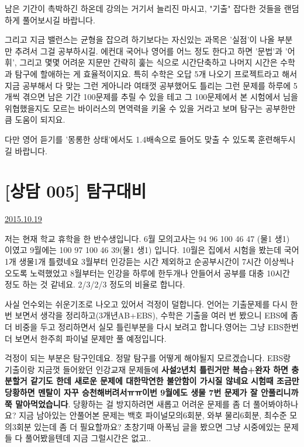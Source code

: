     남은 기간이 촉박하긴 하온데 강의는 거기서 늘리진 마시고, "기출" 잡다한 것들을 랜덤하게 풀어보시길 바랍니다.
    \vspace{5mm}

    그리고 지금 밸런스는 균형을 잡으려 하기보다는
    자신있는 과목은 '실점'이 나올 부분만 추려서 그걸 공부하시길.
    에컨대 국어나 영어를 어느 정도 한다고 하면 '문법'과 '어휘', 그리고 몇몇 어려운 지문만 간략히 훑는 식으로 시간단축하고
    나머지 시간은 수학과 탐구에 할애하는 게 효율적이지요.
    특히 수학은 오답 5개 나오기 프로젝트라고 해서 지금 공부해서 다 맞는 그런 게아니라
    여태껏 공부했어도 틀리는 그런 문제를 하루에 5개씩 겪으면 남은 기간 100문제를 추릴 수 있을 테고
    그 100문제에서 본 시험에서 님을 위협했을지도 모르는 바이러스의 면역력을 키울 수 있을 거라고 보며
    탐구는 공부한만큼 도움이 되지요.
    \vspace{5mm}

    다만 영어 듣기를 '몽롱한 상태'에서도 1.4배속으로 들어도 맞출 수 있도록 훈련해두시길 바랍니다.
    \vspace{5mm}


\section{[상담 005] 탐구대비}
\href{https://www.kockoc.com/Apoc/427357}{2015.10.19}

    \vspace{5mm}

    저는 현재 학교 휴학을 한 반수생입니다. 6월 모의고사는 94 96 100 46 47 (물1 생1) 이였고 9월에는 100 97 100 46 39(물1 생1) 입니다.
    10월은 집에서 시험을 봤는데 국어1개 생물1개 틀렸네요
    3월부터 인강듣는 시간 제외하고 순공부시간이 7시간 이상씩나오도록 노력했었고
    8월부터는 인강을 하루에 한두개나 안들어서 공부를 대충 10시간 정도 하는 것 같네요. 2/3/2/3 정도의 비율로 합니다.
    \vspace{5mm}

    사실 언수외는 쉬운기조로 나오고 있어서 걱정이 덜합니다.
    언어는 기출문제를 다시 한번 보면서 생각을 정리하고(3개년AB+EBS), 수학은 기출을 여러 번 봤으니 EBS에 좀더 비중을 두고 정리하면서 실모 틀린부분을 다시 보려고 합니다.영어는 그냥 EBS한번 더 보면서 한주희 파이널 문제만 풀 예정입니다.
    \vspace{5mm}

    걱정이 되는 부분은 탐구인데요. 정말 탐구를 어떻게 해야될지 모르겠습니다.
    EBS랑 기출이랑 지금껏 들어왔던 인강교재 문제들에 \textbf{사설2년치 틀린거만 복습+완자 하면 충분할거 같기도 한데 새로운 문제에 대한막연한 불안함이 가시질 않네요}
    \textbf{시험때 조금만 당황하면 멘탈이 자꾸 승천해버려서ㅠㅠ이번 9월에도 생물 7번 문제가 잘 안풀리니까 쭉 말아먹었습니다}.
    당황하는 걸 방지하려면 새롭고 어려운 문제를 좀 더 풀어봐야하나요?
    지금 남아있는 안풀어본 문제는 백호 파이널모의6회분, 와부 물리6회분, 최수준 모의3회분 있는데 좀 더 필요할까요?
    초창기때 아폭님 글을 봤으면 그냥 시중에있는 문제들 다 풀어봤을텐데 지금 그럴시간은 없고..
    \vspace{5mm}

